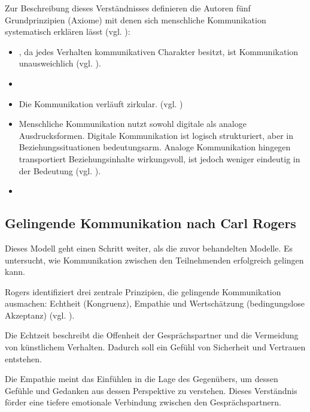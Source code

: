 Zur Beschreibung dieses Verständnisses definieren die Autoren fünf Grundprinzipien (Axiome) mit denen sich menschliche Kommunikation systematisch erklären lässt (vgl. \citealp{Watzlawick2016-km}):
\begin{itemize}
    \item {}, da jedes Verhalten kommunikativen Charakter besitzt, ist Kommunikation unausweichlich (vgl. \citealp[S. 53]{Watzlawick2016-km}).
    \item {} \cite[S. 64]{Watzlawick2016-km}
    \item {} Die Kommunikation verläuft zirkular. (vgl. \citealp[S. 69]{Watzlawick2016-km})
    \item Menschliche Kommunikation nutzt sowohl digitale als analoge Ausdrucksformen. Digitale Kommunikation ist logisch strukturiert, aber in Beziehungssituationen bedeutungsarm. Analoge Kommunikation hingegen transportiert Beziehungsinhalte wirkungsvoll, ist jedoch weniger eindeutig in der Bedeutung (vgl. \citealp[S. 77]{Watzlawick2016-km}).
    \item {} \cite[S. 80]{Watzlawick2016-km}
\end{itemize}

\subsection{Gelingende Kommunikation nach Carl Rogers}
Dieses Modell geht einen Schritt weiter, als die zuvor behandelten Modelle. Es untersucht, wie Kommunikation zwischen den Teilnehmenden erfolgreich gelingen kann.

Rogers identifiziert drei zentrale Prinzipien, die gelingende Kommunikation ausmachen: Echtheit (Kongruenz), Empathie und Wertschätzung (bedingungslose Akzeptanz) (vgl. \citealp{jesse_carl_2025}).

Die Echtzeit beschreibt die Offenheit der Gesprächspartner und die Vermeidung von künstlichem Verhalten. Dadurch soll ein Gefühl von Sicherheit und Vertrauen entstehen. 

Die Empathie meint das Einfühlen in die Lage des Gegenübers, um dessen Gefühle und Gedanken aus dessen Perspektive zu verstehen. Dieses Verständnis förder eine tiefere emotionale Verbindung zwischen den Gesprächspartnern.


